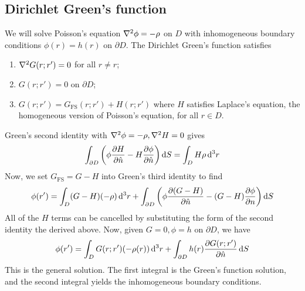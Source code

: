 \subsection{Dirichlet Green's function}
We will solve Poisson's equation \( \laplacian{\phi} = -\rho \) on \( D \) with inhomogeneous boundary conditions \( \phi(r) = h(r) \) on \( \partial D \).
The Dirichlet Green's function satisfies
\begin{enumerate}
	\item \( \laplacian{G(r;r')} = 0 \) for all \( r \neq r \);
	\item \( G(r;r') = 0 \) on \( \partial D \);
	\item \( G(r;r') = G_{\mathrm{FS}}(r;r') + H(r;r') \) where \( H \) satisfies Laplace's equation, the homogeneous version of Poisson's equation, for all \( r \in D \).
\end{enumerate}
Green's second identity with \( \laplacian{\phi} = -\rho, \laplacian{H} = 0 \) gives
\[
	\int_{\partial D} \qty(\phi \pdv{H}{\hat n} - H \pdv{\phi}{\hat n}) \dd{S} = \int_D H \rho \dd[3]{r}
\]
Now, we set \( G_{\mathrm{FS}} = G - H \) into Green's third identity to find
\[
	\phi(r') = \int_D (G - H)(-\rho) \dd[3]{r} + \int_{\partial D} \qty(\phi \pdv{(G - H)}{\hat n} - (G-H) \pdv{\phi}{n}) \dd{S}
\]
All of the \( H \) terms can be cancelled by substituting the form of the second identity the derived above.
Now, given \( G = 0, \phi = h \) on \( \partial D \), we have
\[
	\phi(r') = \int_D G(r;r')(-\rho(r)) \dd[3]{r} + \int_{\partial D} h(r) \pdv{G(r;r')}{\hat n} \dd{S}
\]
This is the general solution.
The first integral is the Green's function solution, and the second integral yields the inhomogeneous boundary conditions.


